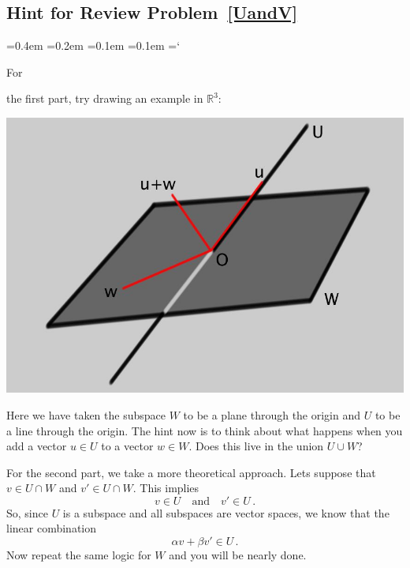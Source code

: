 
\subsection*{Hint for Review Problem~\ref{UandV}}

{\ttfamily
{}\font=0.4em
\font=0.2em
\font=0.1em
\font=0.1em
\hyphenchar\font=`\-

\hypertarget{subspaces_and_spanning_sets_hint}{For} the first part, try drawing an example in ${\mathbb R}^3$:
\begin{center}
\includegraphics[scale=.35]{UunionW.jpg}
\end{center}
Here we have taken the subspace $W$ to be a plane through the origin and
$U$ to be a line through the origin. The hint now is to think about what happens when 
you add a vector $u\in U$ to a vector $w\in W$. Does this live in the union $U\cup W$?

For the second part, we take a more theoretical approach. Lets suppose that $v\in U\cap W$ and $v'\in U\cap W$. This implies
$$
v\in U \quad \mbox{and} \quad v'\in U\, .
$$
So, since $U$ is a subspace and all subspaces are vector spaces, we know that the linear
combination
$$
\alpha v+\beta v'\in U\, .
$$
Now repeat the same logic for $W$ and you will be nearly done.


} %

